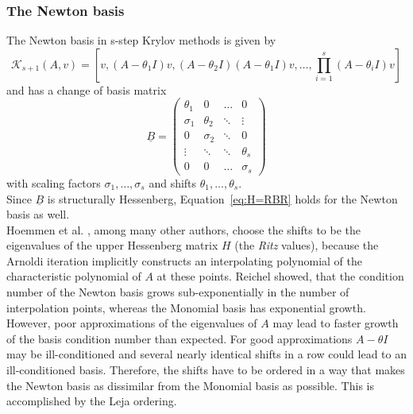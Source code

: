 \documentclass{scrartcl}
\numberwithin{equation}{section}
\begin{document}
\subsubsection{The Newton basis} \label{sec:Newtonbasis}
The Newton basis in s-step Krylov methods is given by 
\begin{equation*}
\mathcal{K}_{s + 1}(A, v) = \left[v, (A - \theta_1 I )v, (A - \theta_2 I )(A - \theta_1 I )v, \ldots, \displaystyle\prod_{i = 1}^s (A - \theta_i I )v\right]
\end{equation*}
and has a change of basis matrix
\begin{equation}
\underline{B} = 
\begin{pmatrix}
\theta_1 & 0 & \ldots & 0 \\
\sigma_1 & \theta_2 & \ddots & \vdots \\
0 & \sigma_2 & \ddots & 0 \\
\vdots & \ddots & \ddots & \theta_s \\
0 & 0 & \ldots & \sigma_s 
\end{pmatrix}
\end{equation}
with scaling factors $\sigma_1, \ldots, \sigma_s$ and shifts $\theta_1, \ldots, \theta_s$.\\

Since $\underline{B}$ is structurally Hessenberg, Equation~\eqref{eq:H=RBR} holds for the Newton basis as well.\\

Hoemmen et al. \cite{Hoemmen:2010:CKS:1970638}, among many other authors, choose the shifts to be the eigenvalues of the upper Hessenberg matrix $H$ (the \textit{Ritz} values), because the Arnoldi iteration implicitly constructs an interpolating polynomial of the characteristic polynomial of $A$ at these points. Reichel \cite{Reichel1990} showed, that the condition number of the Newton basis grows sub-exponentially in the number of interpolation points, whereas the Monomial basis has exponential growth. However, poor approximations of the eigenvalues of $A$ may lead to faster growth of the basis condition number than expected. For good approximations $A - \theta I$ may be ill-conditioned and several nearly identical shifts in a row could lead to an ill-conditioned basis. Therefore, the shifts have to be ordered in a way that makes the Newton basis as dissimilar from the Monomial basis as possible. This is accomplished by the Leja ordering.
\end{document}
